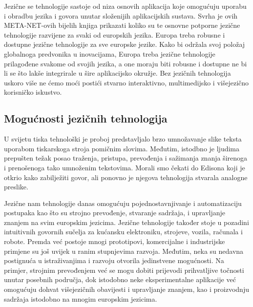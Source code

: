 \begin{multicols}{2}
Jezične se tehnologije sastoje od niza osnovih aplikacija koje omogućuju uporabu i obradbu jezika i govora unutar složenijih aplikacijskih sustava. Svrha je ovih META-NET-ovih bijelih knjiga prikazati koliko su te osnovne potporne jezične tehnologije razvijene za svaki od europskih jezika. Europa treba robusne i dostupne jezične tehnologije za sve europske jezike. Kako bi održala svoj položaj globalnoga predvonika u inovacijama, Europa treba jezične tehnologije prilagođene svakome od svojih jezika, a one moraju biti robusne i dostupne ne bi li se što lakše integrirale u šire aplikacijsko okružje. Bez jezičnih tehnologija uskoro više ne ćemo moći postići stvarno interaktivno, multimedijsko i višejezično korisničko iskustvo.

\subsection{Mogućnosti jezičnih tehnologija}

U svijetu tiska tehnološki je proboj predstavljalo brzo umnožavanje slike teksta uporabom tiskarskoga stroja pomičnim slovima. Međutim, istodbno je ljudima prepušten težak posao traženja, pristupa, prevođenja i sažimanja znanja širenoga i prenošenoga tako umnoženim tekstovima. Morali smo čekati do Edisona koji je otkrio kako zabilježiti govor, ali ponovno je njegova tehnologija stvarala analogne preslike.

Jezične nam tehnologije danas omogućuju pojednostavnjivanje i automatizaciju postupaka kao što su strojno prevođenje, stvaranje sadržaja, i upravljanje znanjem na svim europskim jezicima. Jezične tehnologije također stoje u pozadini intuitivnih govornih sučelja za kućansku elektroniku, strojeve, vozila, računala i robote. Premda već postoje mnogi prototipovi, komercijalne i industrijske primjene su još uvijek u ranim stupnjevima razvoja. Međutim, neka su nedavna postignuća u istraživanjima i razvoju otvorila jedinstvene mogućnosti. Na primjer, strojnim prevođenjem već se mogu dobiti prijevodi prihvatljive točnosti unutar posebnih područja, dok istodobno neke eksperimentalne aplikacije već omogućuju dohvat višejezičnih obavijesti i upravljanje znanjem, kao i proizvodnju sadržaja istodobno na mnogim europskim jezicima.


\end{multicols}
